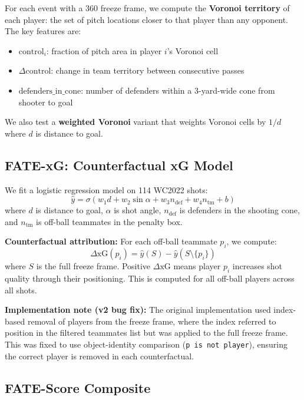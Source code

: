 \documentclass[10pt,twocolumn]{article}
\begin{document}
For each event with a 360 freeze frame, we compute the \textbf{Voronoi territory} of each player: the set of pitch locations closer to that player than any opponent. The key features are:

\begin{itemize}
  \item $\text{control}_{i}$: fraction of pitch area in player $i$'s Voronoi cell
  \item $\Delta\text{control}$: change in team territory between consecutive passes
  \item $\text{defenders\_in\_cone}$: number of defenders within a 3-yard-wide cone from shooter to goal
\end{itemize}

We also test a \textbf{weighted Voronoi} variant that weights Voronoi cells by $1/d$ where $d$ is distance to goal.

\subsection{FATE-xG: Counterfactual xG Model}

We fit a logistic regression model on 114 WC2022 shots:
\begin{equation}
  \hat{y} = \sigma\!\left(w_1 d + w_2 \sin\alpha + w_3 n_{\text{def}} + w_4 n_{\text{tm}} + b\right)
\end{equation}
where $d$ is distance to goal, $\alpha$ is shot angle, $n_{\text{def}}$ is defenders in the shooting cone, and $n_{\text{tm}}$ is off-ball teammates in the penalty box.

\textbf{Counterfactual attribution:} For each off-ball teammate $p_i$, we compute:
\begin{equation}
  \Delta\text{xG}(p_i) = \hat{y}(S) - \hat{y}(S \setminus \{p_i\})
\end{equation}
where $S$ is the full freeze frame. Positive $\Delta\text{xG}$ means player $p_i$ increases shot quality through their positioning. This is computed for all off-ball players across all shots.

\textbf{Implementation note (v2 bug fix):} The original implementation used index-based removal of players from the freeze frame, where the index referred to position in the filtered teammates list but was applied to the full freeze frame. This was fixed to use object-identity comparison (\texttt{p is not player}), ensuring the correct player is removed in each counterfactual.

\subsection{FATE-Score Composite}
\end{document}
